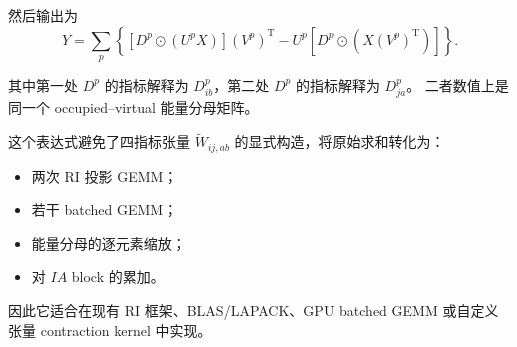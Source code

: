 \documentclass[UTF8,a4paper,11pt]{ctexart}
\newcommand{\Had}{\odot}
\newcommand{\trans}{\mathrm{T}}
\begin{document}
然后输出为
\begin{equation}
\boxed{
Y
=
\sum_p
\left\{
\left[
D^p\Had(U^pX)
\right](V^p)^{\trans}
-
U^p
\left[
D^p\Had(X(V^p)^{\trans})
\right]
\right\}.
}
\end{equation}

其中第一处 $D^p$ 的指标解释为 $D^p_{ib}$，第二处 $D^p$ 的指标解释为 $D^p_{ja}$。
二者数值上是同一个 occupied--virtual 能量分母矩阵。

这个表达式避免了四指标张量 $\widetilde W_{ij,ab}$ 的显式构造，将原始求和转化为：
\begin{itemize}
  \item 两次 RI 投影 GEMM；
  \item 若干 batched GEMM；
  \item 能量分母的逐元素缩放；
  \item 对 $IA$ block 的累加。
\end{itemize}

因此它适合在现有 RI 框架、BLAS/LAPACK、GPU batched GEMM 或自定义张量 contraction kernel 中实现。
\end{document}
